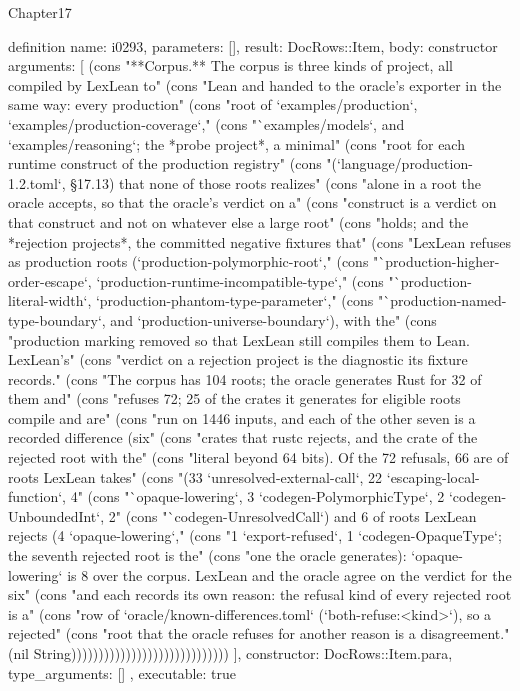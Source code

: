 \begin{lexlean}{Chapter17}
\begin{semanticmodule}
definition{
  name: i0293,
  parameters: [],
  result: DocRows::Item,
  body: constructor{
    arguments: [
      (cons "**Corpus.** The corpus is three kinds of project, all compiled by LexLean to" (cons "Lean and handed to the oracle's exporter in the same way: every production" (cons "root of `examples/production`, `examples/production-coverage`," (cons "`examples/models`, and `examples/reasoning`; the *probe project*, a minimal" (cons "root for each runtime construct of the production registry" (cons "(`language/production-1.2.toml`, §17.13) that none of those roots realizes" (cons "alone in a root the oracle accepts, so that the oracle's verdict on a" (cons "construct is a verdict on that construct and not on whatever else a large root" (cons "holds; and the *rejection projects*, the committed negative fixtures that" (cons "LexLean refuses as production roots (`production-polymorphic-root`," (cons "`production-higher-order-escape`, `production-runtime-incompatible-type`," (cons "`production-literal-width`, `production-phantom-type-parameter`," (cons "`production-named-type-boundary`, and `production-universe-boundary`), with the" (cons "production marking removed so that LexLean still compiles them to Lean. LexLean's" (cons "verdict on a rejection project is the diagnostic its fixture records." (cons "The corpus has 104 roots; the oracle generates Rust for 32 of them and" (cons "refuses 72; 25 of the crates it generates for eligible roots compile and are" (cons "run on 1446 inputs, and each of the other seven is a recorded difference (six" (cons "crates that rustc rejects, and the crate of the rejected root with the" (cons "literal beyond 64 bits). Of the 72 refusals, 66 are of roots LexLean takes" (cons "(33 `unresolved-external-call`, 22 `escaping-local-function`, 4" (cons "`opaque-lowering`, 3 `codegen-PolymorphicType`, 2 `codegen-UnboundedInt`, 2" (cons "`codegen-UnresolvedCall`) and 6 of roots LexLean rejects (4 `opaque-lowering`," (cons "1 `export-refused`, 1 `codegen-OpaqueType`; the seventh rejected root is the" (cons "one the oracle generates): `opaque-lowering` is 8 over the corpus. LexLean and the oracle agree on the verdict for the six" (cons "and each records its own reason: the refusal kind of every rejected root is a" (cons "row of `oracle/known-differences.toml` (`both-refuse:<kind>`), so a rejected" (cons "root that the oracle refuses for another reason is a disagreement." (nil String)))))))))))))))))))))))))))))
    ],
    constructor: DocRows::Item.para,
    type_arguments: []
  },
  executable: true
}


\end{semanticmodule}
\end{lexlean}
